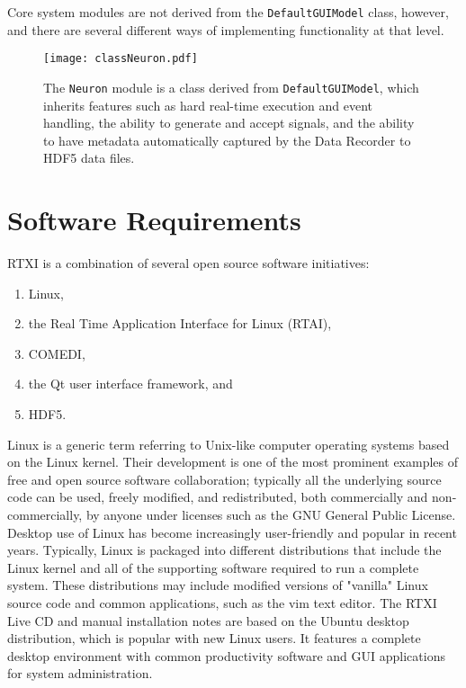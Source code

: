 Core system modules are not derived from the \texttt{DefaultGUIModel} class, however, and there are several different ways of implementing functionality at that level.

\begin{figure} 
\begin{maxipage}
\begin{center}
\texttt{[image: classNeuron.pdf]} 
\caption[DefaultGUIModel-derived module]{The \texttt{Neuron} module is a class derived from \texttt{DefaultGUIModel}, which inherits features such as hard real-time execution and event handling, the ability to generate and accept signals, and the ability to have metadata automatically captured by the Data Recorder to HDF5 data files.} 
\end{center}
\end{maxipage}
\end{figure}

\section{Software Requirements}

RTXI is a combination of several open source software initiatives:

\begin{enumerate}

\item
Linux,

\item
the Real Time Application Interface for Linux (RTAI),

\item
COMEDI,

\item
the Qt user interface framework, and

\item
HDF5.

\end{enumerate}

Linux is a generic term referring to Unix-like computer operating systems based on the Linux kernel. Their development is one of the most prominent examples of free and open source software collaboration; typically all the underlying source code can be used, freely modified, and redistributed, both commercially and non-commercially, by anyone under licenses such as the GNU General Public License. Desktop use of Linux has become increasingly user-friendly and popular in recent years. Typically, Linux is packaged into different distributions that include the Linux kernel and all of the supporting software required to run a complete system. These distributions may include modified versions of "vanilla" Linux source code and common applications, such as the vim text editor. The RTXI Live CD and manual installation notes are based on the Ubuntu desktop distribution, which is popular with new Linux users. It features a complete desktop environment with common productivity software and GUI applications for system administration.

